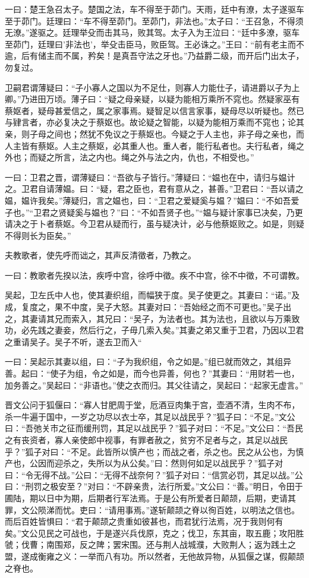 \documentclass[]{article}
\begin{document}
一曰：楚王急召太子。楚国之法，车不得至于茆门。天雨，廷中有潦，太子遂驱车至于茆门。廷理曰：``车不得至茆门。至茆门，非法也。''太子曰：``王召急，不得须无潦。''遂驱之。廷理举殳而击其马，败其驾。太子入为王泣曰：``廷中多潦，驱车至茆门，廷理曰'非法也'，举殳击臣马，败臣驾。王必诛之。''王曰：``前有老主而不逾，后有储主而不属，矜矣！是真吾守法之牙也。''乃益爵二级，而开后门出太子，勿复过。

卫嗣君谓薄疑曰：``子小寡人之国以为不足仕，则寡人力能仕子，请进爵以子为上卿。''乃进田万顷。薄子曰：``疑之母亲疑，以疑为能相万乘所不窕也。然疑家巫有蔡妪者，疑母甚爱信之，属之家事焉。疑智足以信言家事，疑母尽以听疑也。然已与肄言者，亦必复决之于蔡妪也。故论疑之智能，以疑为能相万乘而不窕也；论其亲，则子母之间也；然犹不免议之于蔡妪也。今疑之于人主也，非子母之亲也，而人主皆有蔡妪。人主之蔡妪，必其重人也。重人者，能行私者也。夫行私者，绳之外也；而疑之所言，法之内也。绳之外与法之内，仇也，不相受也。''

一曰：卫君之晋，谓薄疑曰：``吾欲与子皆行。''薄疑曰：``媪也在中，请归与媪计之。卫君自请薄媪。曰：``疑，君之臣也，君有意从之，甚善。''卫君曰：``吾以请之媪，媪许我矣。''薄疑归，言之媪也，曰：``卫君之爱疑奚与媪？''媪曰：``不如吾爱子也。''``卫君之贤疑奚与媪也？''曰：``不如吾贤子也。''``媪与疑计家事已决矣，乃更请决之于卜者蔡妪。今卫君从疑而行，虽与疑决计，必与他蔡妪败之。如是，则疑不得则长为臣矣。''

夫教歌者，使先呼而诎之，其声反清徵者，乃教之。

一曰：教歌者先揆以法，疾呼中宫，徐呼中徵。疾不中宫，徐不中徵，不可谓教。

吴起，卫左氏中人也，使其妻织组，而幅狭于度。吴子使更之。其妻曰：``诺。''及成，复度之，果不中度，吴子大怒。其妻对曰：``吾始经之而不可更也。''吴子出之，其妻请其兄而索入，其兄曰：``吴子，为法者也。其为法也，且欲以与万乘致功，必先践之妻妾，然后行之，子毋几索入矣。''其妻之弟又重于卫君，乃因以卫君之重请吴子。吴子不听，遂去卫而入``

一曰：吴起示其妻以组，曰：``子为我织组，令之如是。''组已就而效之，其组异善。起曰：``使子为组，令之如是，而今也异善，何也？''其妻曰：``用财若一也，加务善之。''吴起曰：``非语也。''使之衣而归。其父往请之，吴起曰：``起家无虚言。''

晋文公问于狐偃曰：``寡人甘肥周于堂，卮酒豆肉集于宫，壶酒不清，生肉不布，杀一牛遍于国中，一岁之功尽以衣士卒，其足以战民乎？''狐子曰：``不足。''文公曰：``吾弛关市之征而缓刑罚，其足以战民乎？''狐子对曰：``不足。''文公曰：``吾民之有丧资者，寡人亲使郎中视事，有罪者赦之，贫穷不足者与之，其足以战民乎？''狐子对曰：``不足。此皆所以慎产也；而战之者，杀之也。民之从公也，为慎产也，公因而迎杀之，失所以为从公矣。''曰：然则何如足以战民乎？''狐子对曰：``令无得不战。''公曰：``无得不战奈何？''狐子对曰：``信赏必罚，其足以战。''公曰：``刑罚之极安至？''对曰：``不辟亲贵，法行所爱。''文公曰：``善。''明日，令田于圃陆，期以日中为期，后期者行军法焉。于是公有所爱者日颠颉，后期，吏请其罪，文公陨涕而忧。吏曰：``请用事焉。''遂斩颠颉之脊以徇百姓，以明法之信也。而后百姓皆惧曰：``君于颠颉之贵重如彼甚也，而君犹行法焉，况于我则何有矣。''文公见民之可战也，于是遂兴兵伐原，克之；伐卫，东其亩，取五鹿；攻阳胜虢；伐曹；南围郑，反之陴；罢宋围。还与荆人战城濮，大败荆人；返为践土之盟，遂成衡雍之义：一举而八有功。所以然者，无他故异物，从狐偃之谋，假颠颉之脊也。
\end{document}
